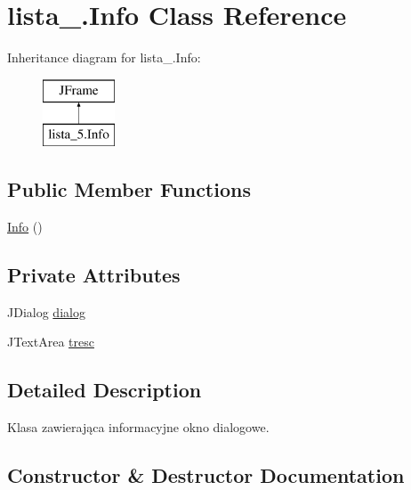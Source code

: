 \hypertarget{classlista__5_1_1_info}{}\section{lista\+\_.\+Info Class Reference}
\label{classlista__5_1_1_info}
Inheritance diagram for lista\+\_.\+Info\+:\begin{figure}[H]
\begin{center}
\leavevmode
\includegraphics[height=2.000000cm]{classlista__5_1_1_info}
\end{center}
\end{figure}
\subsection*{Public Member Functions}
\begin{DoxyCompactItemize}
\item 
\mbox{\hyperlink{classlista__5_1_1_info_a2485b75de11cae1f2b4a979cb33c875f}{Info}} ()
\end{DoxyCompactItemize}
\subsection*{Private Attributes}
\begin{DoxyCompactItemize}
\item 
J\+Dialog \mbox{\hyperlink{classlista__5_1_1_info_a130163346a8f8eabc00532453d238e4a}{dialog}}
\item 
J\+Text\+Area \mbox{\hyperlink{classlista__5_1_1_info_aef87a771dccda7ab0c438b53904a21e6}{tresc}}
\end{DoxyCompactItemize}


\subsection{Detailed Description}
Klasa zawierająca informacyjne okno dialogowe. 

\subsection{Constructor \& Destructor Documentation}
\mbox{\label{classlista__5_1_1_info_a2485b75de11cae1f2b4a979cb33c875f}} 
